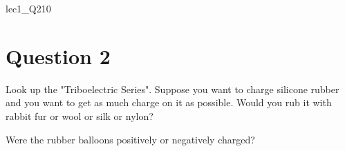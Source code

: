 \documentclass[12pt]{article}
\begin{document}
\begin{edXproblem}{lec1_Q2}{10}

\section{Question 2}

Look up the "Triboelectric Series". Suppose you want to charge
silicone rubber and you want to get as much charge on it as
possible. Would you rub it with rabbit fur or wool or silk or nylon?


Were the rubber balloons positively or negatively charged?



\end{edXproblem}

\end{document}
